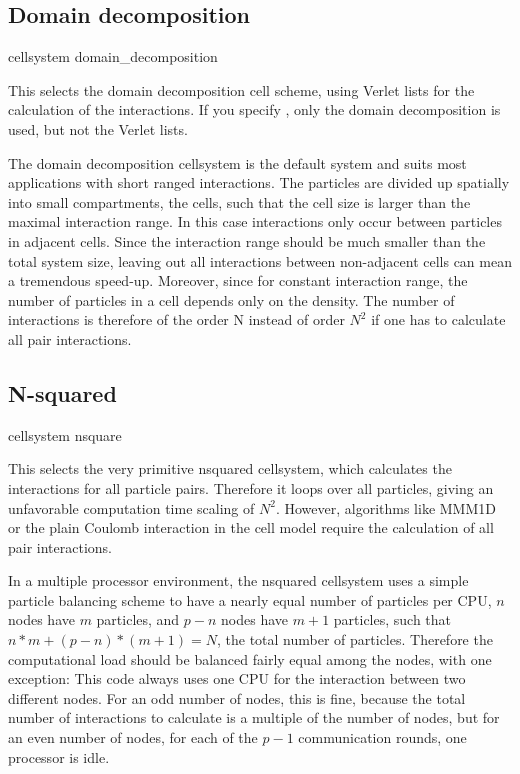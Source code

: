 \subsection{Domain decomposition}
\begin{essyntax}
  cellsystem domain_decomposition 
\end{essyntax}
This selects the domain decomposition cell scheme, using Verlet lists
for the calculation of the interactions. If you specify
, only the domain decomposition is used, but
not the Verlet lists.

The domain decomposition cellsystem is the default system and suits
most applications with short ranged interactions. The particles are
divided up spatially into small compartments, the cells, such that the
cell size is larger than the maximal interaction range. In this case
interactions only occur between particles in adjacent cells. Since the
interaction range should be much smaller than the total system size,
leaving out all interactions between non-adjacent cells can mean a
tremendous speed-up. Moreover, since for constant interaction range,
the number of particles in a cell depends only on the density. The
number of interactions is therefore of the order N instead of order
$N^2$ if one has to calculate all pair interactions.

\subsection{N-squared}
\begin{essyntax}
  cellsystem nsquare 
\end{essyntax}
This selects the very primitive nsquared cellsystem, which calculates
the interactions for all particle pairs. Therefore it loops over all
particles, giving an unfavorable computation time scaling of $N^2$.
However, algorithms like MMM1D or the plain Coulomb interaction in the
cell model require the calculation of all pair interactions.

In a multiple processor environment, the nsquared cellsystem uses a
simple particle balancing scheme to have a nearly equal number of
particles per CPU, \ie $n$ nodes have $m$ particles, and $p-n$ nodes
have $m+1$ particles, such that $n*m+(p-n)*(m+1)=N$, the total number
of particles. Therefore the computational load should be balanced
fairly equal among the nodes, with one exception: This code always
uses one CPU for the interaction between two different nodes. For an
odd number of nodes, this is fine, because the total number of
interactions to calculate is a multiple of the number of nodes, but
for an even number of nodes, for each of the $p-1$ communication
rounds, one processor is idle.

